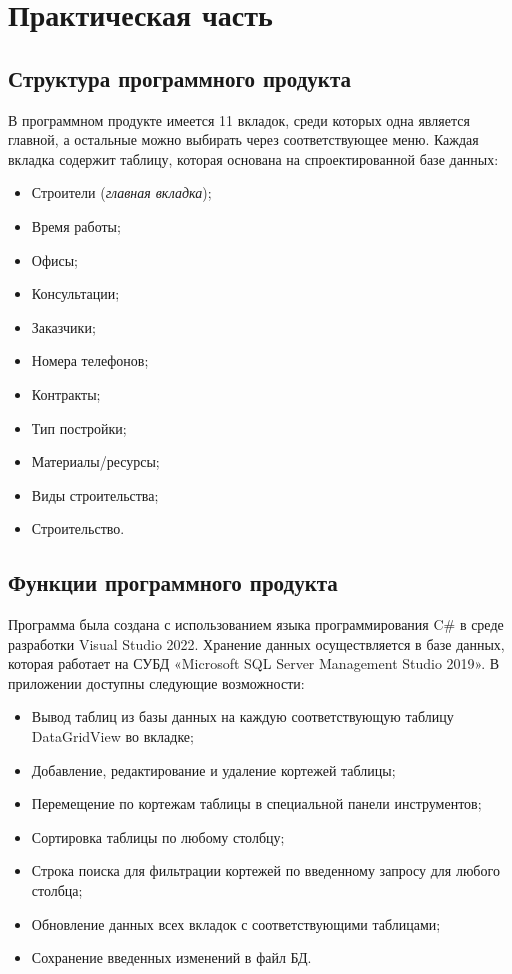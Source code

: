 \documentclass{../SIBGU-state}
\begin{document}
\section{Практическая часть}

\subsection{Структура программного продукта}
В программном продукте имеется 11 вкладок, среди которых одна является главной, а остальные можно выбирать через соответствующее меню. Каждая вкладка содержит таблицу, которая основана на спроектированной базе данных: \par
\begin{itemize}
	\item Строители (\textit{главная вкладка});
	\item Время работы;
    \item Офисы;
    \item Консультации;
    \item Заказчики;
    \item Номера телефонов;
    \item Контракты;
    \item Тип постройки;
    \item Материалы/ресурсы;
    \item Виды строительства;
    \item Строительство.
\end{itemize}\par\bigskip

\subsection{Функции программного продукта}
Программа была создана с использованием языка программирования C\# в среде разработки Visual Studio 2022. Хранение данных осуществляется в базе данных, которая работает на СУБД «Microsoft SQL Server Management Studio 2019». В приложении доступны следующие возможности: \par
\begin{itemize}
	\item Вывод таблиц из базы данных на каждую соответствующую таблицу DataGridView во вкладке;
	\item Добавление, редактирование и удаление кортежей таблицы;
    \item Перемещение по кортежам таблицы в специальной панели инструментов;
    \item Сортировка таблицы по любому столбцу;
    \item Строка поиска для фильтрации кортежей по введенному запросу для любого столбца;
    \item Обновление данных всех вкладок с соответствующими таблицами;
    \item Сохранение введенных изменений в файл БД.
\end{itemize}\par\bigskip
\end{document}
